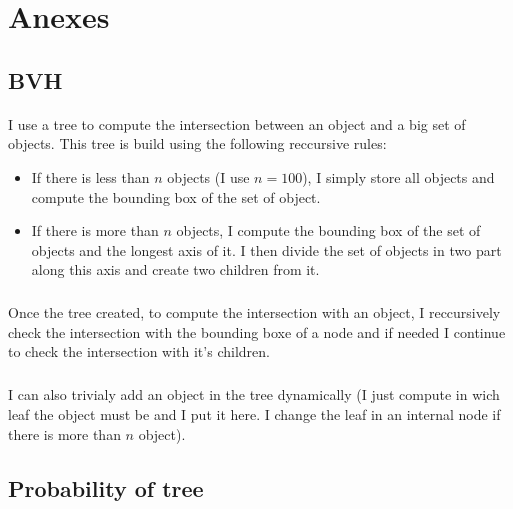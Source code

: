 \documentclass[a4paper,12pt]{article}
\begin{document}

\section*{Anexes}


\subsection*{BVH}
\label{sec:anexe_bvh}

\paragraph{} I use a tree to compute the intersection between an object and a big set of objects. This tree is build using the following reccursive rules:
\begin{itemize}
  \item If there is less than $n$ objects (I use $n=100$), I simply store all objects and compute the bounding box of the set of object.
  \item If there is more than $n$ objects, I compute the bounding box of the set of objects and the longest axis of it. I then divide the set of objects in two part along this axis and create two children from it.
\end{itemize}

\subparagraph{} Once the tree created, to compute the intersection with an object, I reccursively check the intersection with the bounding boxe of a node and if needed I continue to check the intersection with it's children.

\subparagraph{} I can also trivialy add an object in the tree dynamically (I just compute in wich leaf the object must be and I put it here. I change the leaf in an internal node if there is more than $n$ object).

\subsection*{Probability of tree}
\label{sec:anexe_tree}

\end{document}
